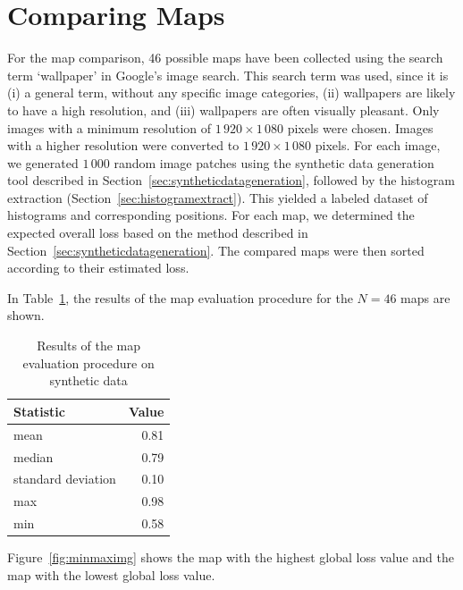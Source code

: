 \documentclass[11pt]{report}
\begin{document}
\section{Comparing Maps}

For the map comparison, 46 possible maps have been collected using the
search term `wallpaper' in Google's image search. This search term was
used, since it is (i) a general term, without any specific image
categories, (ii) wallpapers are likely to have a high resolution, and
(iii) wallpapers are often visually pleasant. Only images with a
minimum resolution of $1\,920 \times 1\,080$ pixels were
chosen. Images with a higher resolution were converted to $1\,920
\times 1\,080$ pixels. For each image, we generated $1\,000$ random
image patches using the synthetic data generation tool described in
Section~\ref{sec:syntheticdatageneration}, followed by the histogram
extraction (Section~\ref{sec:histogramextract}). This yielded a
labeled dataset of histograms and corresponding positions. For each
map, we determined the expected overall loss based on the method
described in Section~\ref{sec:syntheticdatageneration}. The compared
maps were then sorted according to their estimated loss.


In Table~\ref{tab:mapeval}, the results of the map evaluation
procedure for the $N = 46$ maps are shown.

\begin{table}[h!]
  \centering
  \begin{tabular}{lr}
    \toprule
    Statistic & Value\\
    \midrule
    mean & 0.81\\
    median & 0.79\\
    standard deviation & 0.10\\
    max & 0.98\\
    min & 0.58\\    
    \bottomrule
  \end{tabular}
  \caption[Map evaluation procedure on synthetic data]{Results of the map evaluation procedure on synthetic data}
  \label{tab:mapeval}

\end{table}

Figure~\ref{fig:minmaximg} shows the map with the highest global loss
value and the map with the lowest global loss value.
\end{document}

